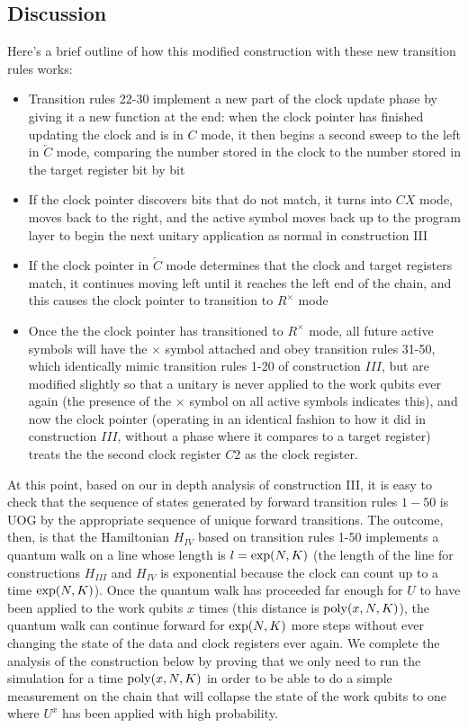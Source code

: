 \documentclass[11pt,letterpaper]{article}
\newcommand{\<}{\langle}
\renewcommand{\>}{\rangle}
\begin{document}
\subsection{Discussion}
Here's a brief outline of how this modified construction with these new transition rules works:
\begin{itemize}
	\item Transition rules 22-30 implement a new part of the clock update phase by giving it a new function at the end: when the clock pointer has finished updating the clock and is in $C$ mode, it then begins a second sweep to the left in $\overleftarrow{C}$ mode, comparing the number stored in the clock to the number stored in the target register bit by bit
	\item If the clock pointer discovers bits that do not match, it turns into $CX$ mode, moves back to the right, and the active symbol moves back up to the program layer to begin the next unitary application as normal in construction III
	\item If the clock pointer in $\overleftarrow{C}$ mode determines that the clock and target registers match, it continues moving left until it reaches the left end of the chain, and this causes the clock pointer to transition to $R^{\times}$ mode
	\item Once the the clock pointer has transitioned to $R^{\times}$ mode, all future active symbols will have the $\times$ symbol attached and obey transition rules 31-50, which identically mimic transition rules 1-20 of construction $III$, but are modified slightly so that a unitary is never applied to the work qubits ever again (the presence of the $\times$ symbol on all active symbols indicates this), and now the clock pointer (operating in an identical fashion to how it did in construction $III$, without a phase where it compares to a target register) treats the the second clock register $C2$ as the clock register.
\end{itemize}
At this point, based on our in depth analysis of construction III, it is easy to check that the sequence of states generated by forward transition rules $1-50$ is UOG by the appropriate sequence of unique forward transitions. The outcome, then, is that the Hamiltonian $H_{IV}$ based on transition rules 1-50 implements a quantum walk on a line whose length is $l={\rm{exp}}(N,K)$ (the length of the line for constructions $H_{III}$ and $H_{IV}$ is exponential because the clock can count up to a time ${\rm{exp}}(N,K)$). Once the quantum walk has proceeded far enough for $U$ to have been applied to the work qubits $x$ times (this distance is ${\rm{poly}}(x,N,K)$), the quantum walk can continue forward for ${\rm{exp}}(N,K)$ more steps without ever changing the state of the data and clock registers ever again. We complete the analysis of the construction below by proving that we only need to run the simulation for a time ${\rm{poly}}(x,N,K)$ in order to be able to do a simple measurement on the chain that will collapse the state of the work qubits to one where $U^x$ has been applied with high probability.
\end{document}
